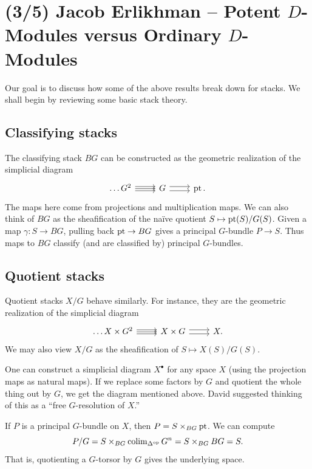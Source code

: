 \documentclass{article}
\begin{document}
\section{(3/5) Jacob Erlikhman -- Potent $D$-Modules versus Ordinary $D$-Modules}

Our goal is to discuss how some of the above results break down for stacks.
We shall begin by reviewing some basic stack theory.

\subsection{Classifying stacks}

The classifying stack $BG$ can be constructed as the geometric realization of the simplicial diagram 
\[
  \begin{tikzcd}
    \dots G^2 \rar[shift left] \rar \rar[shift right] & G \rar[shift left] \rar[shift right] & \pt.
  \end{tikzcd}
\]
The maps here come from projections and multiplication maps.
We can also think of $BG$ as the sheafification of the na\"ive quotient $S \mapsto \operatorname{pt}(S) / G(S)$.
Given a map $\gamma: S \to BG$, pulling back $\operatorname{pt} \to BG$ gives a principal $G$-bundle $P \to S$.
Thus maps to $BG$ classify (and are classified by) principal $G$-bundles.

\subsection{Quotient stacks}

Quotient stacks $X / G$ behave similarly.
For instance, they are the geometric realization of the simplicial diagram 
\[
  \begin{tikzcd}
    \dots X \times G^2 \rar[shift left] \rar \rar[shift right] & X \times G \rar[shift left] \rar[shift right] & X.
  \end{tikzcd}
\]
We may also view $X / G$ as the sheafification of $S \mapsto X(S) / G(S)$.

\begin{rmk}
  One can construct a simplicial diagram $X^\bullet$ for any space $X$ (using the projection maps as natural maps).
  If we replace some factors by $G$ and quotient the whole thing out by $G$, we get the diagram mentioned above.
  David suggested thinking of this as a ``free $G$-resolution of $X$.''
\end{rmk}

\begin{ex}
  If $P$ is a principal $G$-bundle on $X$, then $P = S \times_{BG} \operatorname{pt}$.
  We can compute
  \[
    P / G = S \times_{BG} \operatorname{colim}_{\Delta^{\mathrm{op}}} G^n = S \times_{BG} BG = S.
  \]
  That is, quotienting a $G$-torsor by $G$ gives the underlying space.
\end{ex}
\end{document}
